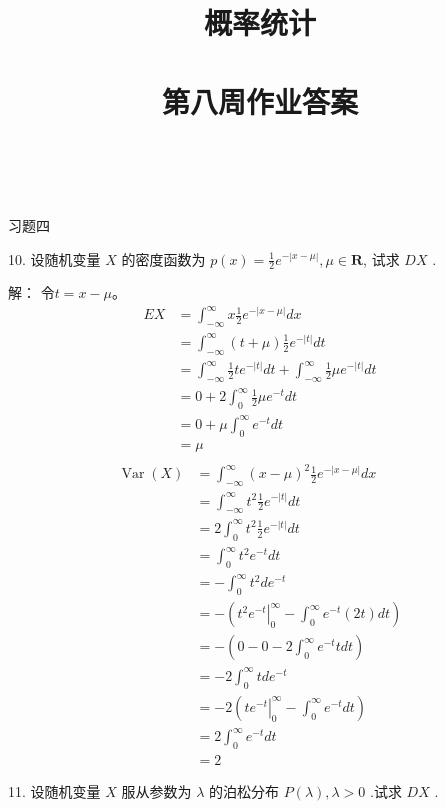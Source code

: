 \documentclass[14pt]{scrartcl} %
\title{	
	\normalfont \huge
	\textsc{概率统计} \\ [25pt] %
	\horrule{0.5pt} \\[0.4cm] %
	\huge 第八周作业答案 \\ %
	\horrule{0.5pt} \\[0.4cm] %
	\date{}
}
\numberwithin{equation}{section} %
\numberwithin{figure}{section} %
\numberwithin{table}{section} %
\begin{document}
	\maketitle %
	习题四
	
	10. 设随机变量 $X$ 的密度函数为 $p(x)=\frac{1}{2} e^{-|x-\mu|}, \mu \in \mathbf{R}$, 试求 $D X$ .
	
	解：
	令$t=x-\mu$。
	\[
	\begin{aligned}
		E X&=\int_{-\infty}^{\infty} x \frac{1}{2} e^{-|x-\mu|} d x \\
		& =\int_{-\infty}^{\infty}(t+\mu) \frac{1}{2} e^{-|t|} d t \\
		& =\int_{-\infty}^{\infty} \frac{1}{2} t e^{-|t|} d t+\int_{-\infty}^{\infty} \frac{1}{2} \mu e^{-|t|} d t \\
		& =0+2 \int_0^{\infty} \frac{1}{2} \mu e^{-t} d t \\
		& =0+\mu \int_0^{\infty} e^{-t} d t \\
		& =\mu \\
	\end{aligned}
	\]
	\[
	\begin{aligned}
		 \operatorname{Var}(X)&=\int_{-\infty}^{\infty}(x-\mu)^2 \frac{1}{2} e^{-|x-\mu|} d x \\
		& =\int_{-\infty}^{\infty} t^2 \frac{1}{2} e^{-|t|} d t \\
		& =2 \int_0^{\infty} t^2 \frac{1}{2} e^{-|t|} d t \\
		& =\int_0^{\infty} t^2 e^{-t} d t \\
		& =-\int_0^{\infty} t^2 d e^{-t} \\
		& =-\left(\left.t^2 e^{-t}\right|_0 ^{\infty}-\int_0^{\infty} e^{-t}(2 t) d t\right) \\
		& =-\left(0-0-2 \int_0^{\infty} e^{-t} t d t\right) \\
		& =-2 \int_0^{\infty} t d e^{-t} \\
		& =-2\left(\left.t e^{-t}\right|_0 ^{\infty}-\int_0^{\infty} e^{-t} d t\right) \\
		& =2 \int_0^{\infty} e^{-t} d t \\
		& =2
	\end{aligned}
	\]
	
	11. 设随机变量 $X$ 服从参数为 $\lambda$ 的泊松分布 $P(\lambda), \lambda>0$ .试求 $D X$ .
	
\end{document}
